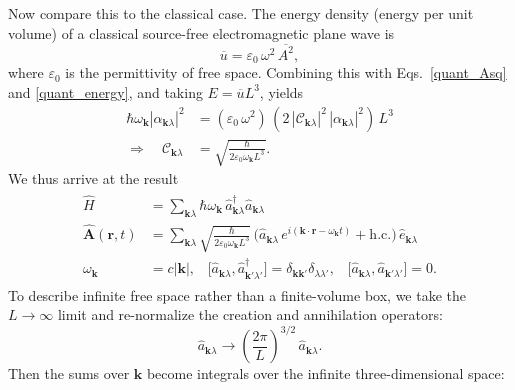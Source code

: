\documentclass[pra,12pt]{revtex4}
\begin{document}
Now compare this to the classical case.  The energy density (energy
per unit volume) of a classical source-free electromagnetic plane wave
is
\begin{equation}
  \overline{u} = \varepsilon_0\, \omega^2 \, \overline{A^2},
\end{equation}
where $\varepsilon_0$ is the permittivity of free space.  Combining
this with Eqs.~\eqref{quant_Asq} and \eqref{quant_energy}, and taking
$E = \overline{u} L^3$, yields
\begin{align}
  \hbar\omega_{\mathbf{k}} |\alpha_{\mathbf{k}\lambda}|^2 &=
  \left(\varepsilon_0\, \omega^2\right) \,
  \left(2 \, |\mathcal{C}_{\mathbf{k}\lambda}|^2 \, |\alpha_{\mathbf{k}\lambda}|^2\right)\, L^3 \\
  \Rightarrow \quad \mathcal{C}_{\mathbf{k}\lambda} &= \sqrt{\frac{\hbar}{2\varepsilon_0\omega_{\mathbf{k}}L^3}}.
\end{align}
We thus arrive at the result
\begin{align}
\boxed{\qquad
  \begin{aligned}
    \hat{H} &= \sum_{\mathbf{k}\lambda} \hbar \omega_{\mathbf{k}} \,
    \hat{a}^\dagger_{\mathbf{k}\lambda} \hat{a}_{\mathbf{k}\lambda} \\
  \hat{\mathbf{A}}(\mathbf{r},t) &= \sum_{\mathbf{k}\lambda} 
  \sqrt{\frac{\hbar}{2\varepsilon_0\omega_{\mathbf{k}}L^3}}\,
  \Big(\hat{a}_{\mathbf{k}\lambda} \, e^{i(\mathbf{k}\cdot\mathbf{r} - \omega_{\mathbf{k}} t)}
  + \mathrm{h.c.}\Big)\, \hat{e}_{\mathbf{k}\lambda} \\
  \omega_{\mathbf{k}} &= c|\mathbf{k}|,  \;\;\;
  \big[\hat{a}_{\mathbf{k}\lambda}, \hat{a}_{\mathbf{k}'\lambda'}^\dagger\big]
  = \delta_{\mathbf{k}\mathbf{k}'} \delta_{\lambda\lambda'}, \;\;\;
  \big[\hat{a}_{\mathbf{k}\lambda}, \hat{a}_{\mathbf{k}'\lambda'}\big]
  = 0.
  \end{aligned}
  \qquad}
  \label{qed1}
\end{align}
To describe infinite free space rather than a finite-volume box, we
take the $L\rightarrow \infty$ limit and re-normalize the creation and
annihilation operators:
\begin{equation}
  \hat{a}_{\mathbf{k}\lambda} \rightarrow \left(\frac{2\pi}{L}\right)^{3/2} \,
  \hat{a}_{\mathbf{k}\lambda}.
\end{equation}
Then the sums over $\mathbf{k}$ become integrals over the infinite
three-dimensional space:
\end{document}
